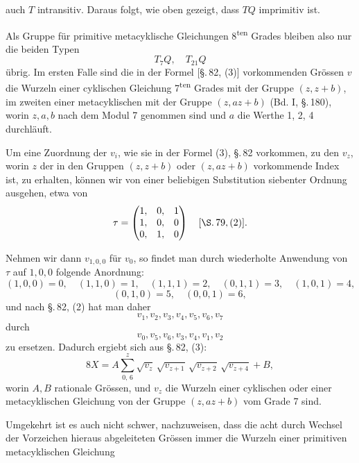 auch $T$ intransitiv. Daraus folgt, wie oben gezeigt, dass $TQ$
imprimitiv ist.

Als Gruppe für primitive metacyklische Gleichungen 8\textsuperscript{ten}
Grades bleiben also nur die beiden Typen
\[
T_7 Q, \quad T_{21} Q
\]
übrig. Im ersten Falle sind die in der Formel [\S.\,82, (3)] vorkommenden
Grössen $v$ die Wurzeln einer cyklischen Gleichung 7\textsuperscript{ten}
Grades mit der Gruppe $(z, z+b)$, im zweiten einer metacyklischen mit der
Gruppe $(z, az+b)$ (Bd. I, \S.\,180), worin $z, a, b$ nach dem Modul 7
genommen sind und $a$ die Werthe 1, 2, 4 durchläuft.

Um eine Zuordnung der $v_i$, wie sie in der Formel (3), \S.\,82 vorkommen,
zu den $v_z$, worin $z$ der in den Gruppen $(z, z+b)$ oder $(z, az+b)$
vorkommende Index ist, zu erhalten, können wir von einer beliebigen
Substitution siebenter Ordnung ausgehen, etwa von
\[
\tau = \begin{pmatrix} 1, & 0, & 1 \\ 1, & 0, & 0 \\ 0, & 1, & 0 \end{pmatrix}
\quad [\S.\,79, (2)].
\]

Nehmen wir dann $v_{1,0,0}$ für $v_0$, so findet man durch wiederholte
Anwendung von $\tau$ auf $1, 0, 0$ folgende Anordnung:
\[
(1,0,0)=0, \quad (1,1,0)=1, \quad (1,1,1)=2, \quad (0,1,1)=3, \quad (1,0,1)=4,
\]
\[
(0,1,0)=5, \quad (0,0,1)=6,
\]
und nach \S.\,82, (2) hat man daher
\[
v_1, v_2, v_3, v_4, v_5, v_6, v_7
\]
durch
\[
v_0, v_5, v_6, v_3, v_4, v_1, v_2
\]
zu ersetzen. Dadurch ergiebt sich aus \S.\,82, (3):
\[
8X = A \sum_{0,\,6}^{z} \sqrt{v_z}\,\sqrt{v_{z+1}}\,\sqrt{v_{z+2}}\,\sqrt{v_{z+4}} + B,
\]
worin $A, B$ rationale Grössen, und $v_z$ die Wurzeln einer cyklischen oder
einer metacyklischen Gleichung von der Gruppe $(z, az+b)$ vom Grade 7 sind.

Umgekehrt ist es auch nicht schwer, nachzuweisen, dass die acht durch
Wechsel der Vorzeichen hieraus abgeleiteten Grössen immer die Wurzeln
einer primitiven metacyklischen Gleichung
